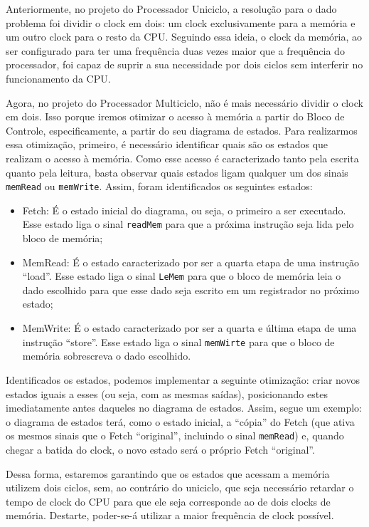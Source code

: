 \documentclass[a4paper,12pt]{article}
\newcommand{\cod}[1]{\texttt{#1}}
\begin{document}
Anteriormente, no projeto do Processador Uniciclo, a resolução para o dado problema foi dividir o clock em dois: um clock exclusivamente para a memória e um outro clock para o resto da CPU. Seguindo essa ideia, o clock da memória, ao ser configurado para ter uma frequência duas vezes maior que a frequência do processador, foi capaz de suprir a sua necessidade por dois ciclos sem interferir no funcionamento da CPU.

Agora, no projeto do Processador Multiciclo, não é mais necessário dividir o clock em dois. Isso porque iremos otimizar o acesso à memória a partir do Bloco de Controle, especificamente, a partir do seu diagrama de estados. Para realizarmos essa otimização, primeiro, é necessário identificar quais são os estados que realizam o acesso à memória. Como esse acesso é caracterizado tanto pela escrita quanto pela leitura, basta observar quais estados ligam qualquer um dos sinais \cod{memRead} ou \cod{memWrite}. Assim, foram identificados os seguintes estados:

\begin{itemize}
    \item Fetch: É o estado inicial do diagrama, ou seja, o primeiro a ser executado. Esse estado liga o sinal \cod{readMem} para que a próxima instrução seja lida pelo bloco de memória;
    \item MemRead: É o estado caracterizado por ser a quarta etapa de uma instrução ``load''. Esse estado liga o sinal \cod{LeMem} para que o bloco de memória leia o dado escolhido para que esse dado seja escrito em um registrador no próximo estado;
    \item MemWrite: É o estado caracterizado por ser a quarta e última etapa de uma instrução ``store''. Esse estado liga o sinal \cod{memWirte} para que o bloco de memória sobrescreva o dado escolhido.
\end{itemize}

Identificados os estados, podemos implementar a seguinte otimização: criar novos estados iguais a esses (ou seja, com as mesmas saídas), posicionando estes imediatamente antes daqueles no diagrama de estados. Assim, segue um exemplo: o diagrama de estados terá, como o estado inicial, a ``cópia'' do Fetch (que ativa os mesmos sinais que o Fetch ``original'', incluindo o sinal \cod{memRead}) e, quando chegar a batida do clock, o novo estado será o próprio Fetch ``original''.

Dessa forma, estaremos garantindo que os estados que acessam a memória utilizem dois ciclos, sem, ao contrário do uniciclo, que seja necessário retardar o tempo de clock do CPU para que ele seja corresponde ao de dois clocks de memória. Destarte, poder-se-á utilizar a maior frequência de clock possível.
\end{document}
